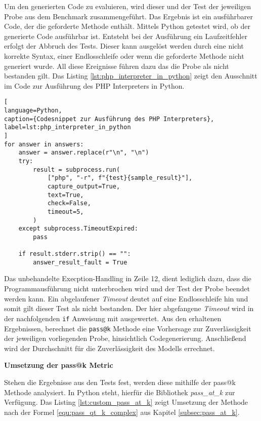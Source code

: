 Um den generierten Code zu evaluieren, wird dieser und der Test der jeweiligen Probe aus dem Benchmark zusammengeführt. Das Ergebnis ist ein ausführbarer Code, der die geforderte Methode enthält. Mittels Python getestet wird, ob der generierte Code ausführbar ist. Entsteht bei der Ausführung ein Laufzeitfehler erfolgt der Abbruch des Tests. Dieser kann ausgelöst werden durch eine nicht korrekte Syntax, einer Endlosschleife oder wenn die geforderte Methode nicht generiert wurde. All diese Ereignisse führen dazu das die Probe als nicht bestanden gilt. Das Listing \ref{lst:php_interpreter_in_python} zeigt den Ausschnitt im Code zur Ausführung des PHP Interpreters in Python.\vspace{0.2cm}

\begin{lstlisting}[
language=Python,
caption={Codesnippet zur Ausführung des PHP Interpreters},
label=lst:php_interpreter_in_python
]
for answer in answers:
    answer = answer.replace(r"\n", "\n")
    try:
        result = subprocess.run(
            ["php", "-r", f"{test}{sample_result}"],
            capture_output=True,
            text=True,
            check=False,
            timeout=5,
        )
    except subprocess.TimeoutExpired:
        pass

    if result.stderr.strip() == "":
        answer_result_fault = True
\end{lstlisting}

Das unbehandelte Execption-Handling in Zeile 12, dient lediglich dazu, dass die Programmausführung nicht unterbrochen wird und der Test der Probe beendet werden kann. Ein abgelaufener \textit{Timeout} deutet auf eine Endlosschleife hin und somit gilt dieser Test als nicht bestanden. Der hier abgefangene \textit{Timeout} wird in der nachfolgenden \texttt{if} Anweisung mit ausgewertet. Aus den erhaltenen Ergebnissen, berechnet die \texttt{pass@k} Methode eine Vorhersage zur Zuverlässigkeit der jeweiligen vorliegenden Probe, hinsichtlich Codegenerierung. Anschließend wird der Durchschnitt für die Zuverlässigkeit des Modells errechnet.\vspace{0.2cm}

\textbf{Umsetzung der pass@k Metric}\vspace{0.2cm}

Stehen die Ergebnisse aus den Tests fest, werden diese mithilfe der pass@k Methode analysiert. In Python steht, hierfür die Bibliothek \textit{pass\_at\_k} zur Verfügung. Das Listing \ref{lst:custom_pass_at_k} zeigt Umsetzung der Methode nach der Formel \ref{equ:pass_qt_k_complex} aus Kapitel \ref{subsec:pass_at_k}.

